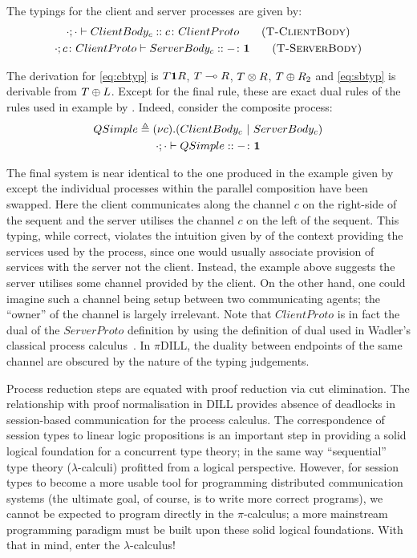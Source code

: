 \documentclass{mprop}
\begin{document}
\begin{samepage}
The typings for the client and server processes are given by:
\begin{gather*}
\tsequent{\cdot}{\cdot}{ClientBody_c}{\typedid{c}{ClientProto}}
\tag{\mkTrule{ClientBody}} \label{eq:cbtyp}
\\ \tsequent{\cdot}{\typedid{c}{ClientProto}}{ServerBody_c}{\typedid{-}{\1}}
\tag{\mkTrule{ServerBody}} \label{eq:sbtyp}
\end{gather*}
\end{samepage}

The derivation for \eqref{eq:cbtyp} is $T\mathbf{1} R$, ${T}\multimap{R}$, ${T}\otimes{R}$,
${T}\oplus{R_2}$ and \eqref{eq:sbtyp} is derivable from
${T}\oplus{L}$. Except for the final rule, these are exact dual rules of the
rules used in example by \citeauthor{Caires:2010:STI}. Indeed, consider the
composite process:
\begin{gather*}
{QSimple}\triangleq{(\nu{c}).({ClientBody_c}~|~{ServerBody_c})}\\
{\cdot};{\cdot}\vdash{QSimple}::{{-}\colon{\mathbf{1}}}
\end{gather*}

The final system is near identical to the one produced in the example given by
\citeauthor{Caires:2010:STI} except the individual processes within the
parallel composition have been swapped. Here the client communicates along the
channel $c$ on the right-side of the sequent and the server utilises the
channel $c$ on the left of the sequent. This typing, while correct, violates
the intuition given by \citeauthor{Caires:2010:STI} of the context providing
the services used by the process, since one would usually associate provision
of services with the server not the client. Instead, the example above
suggests the server utilises some channel provided by the client. On the other
hand, one could imagine such a channel being setup between two communicating
agents; the ``owner'' of the channel is largely irrelevant. Note that
$ClientProto$ is in fact the dual of the $ServerProto$ definition by
\citeauthor{Caires:2010:STI} using the definition of dual used in Wadler's
classical process calculus~\cite{Wadler:2014}. In $\pi$DILL, the duality
between endpoints of the same channel are obscured by the nature of the typing
judgements.

Process reduction steps are equated with proof reduction via cut
elimination. The relationship with proof normalisation in DILL provides
absence of deadlocks in session-based communication for the process
calculus. The correspondence of session types to linear logic propositions is
an important step in providing a solid logical foundation for a concurrent
type theory; in the same way ``sequential'' type theory ($\lambda$-calculi)
profitted from a logical perspective. However, for session types to become a
more usable tool for programming distributed communication systems (the
ultimate goal, of course, is to write more correct programs), we cannot be
expected to program directly in the $\pi$-calculus; a more mainstream
programming paradigm must be built upon these solid logical foundations. With
that in mind, enter the $\lambda$-calculus!
\end{document}
